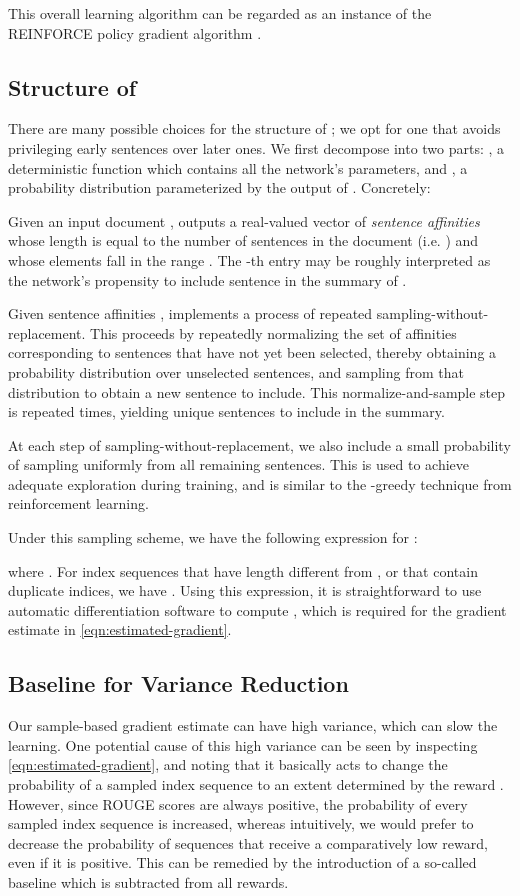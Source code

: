 \documentclass[11pt,a4paper]{article}
\begin{document}
This overall learning algorithm can be regarded as an instance of the REINFORCE policy gradient algorithm \citep{williams1992simple}.

\subsection{Structure of }
There are many possible choices for the structure of ; we opt for one that avoids privileging early sentences over later ones. We first decompose  into two parts: , a deterministic function which contains all the network's parameters, and , a probability distribution parameterized by the output of . Concretely:

Given an input document ,  outputs a real-valued vector of \textit{sentence affinities} whose length is equal to the number of sentences in the document (i.e. ) and whose elements fall in the range . The -th entry  may be roughly interpreted as the network's propensity to include sentence  in the summary of .

Given sentence affinities ,  implements a process of repeated sampling-without-replacement. This proceeds by repeatedly normalizing the set of affinities corresponding to sentences that have not yet been selected, thereby obtaining a probability distribution over unselected sentences, and sampling from that distribution to obtain a new sentence to include. This normalize-and-sample step is repeated  times, yielding  unique sentences to include in the summary.

At each step of sampling-without-replacement, we also include a small probability  of sampling uniformly from all remaining sentences. This is used to achieve adequate exploration during training, and is similar to the -greedy technique from reinforcement learning.

Under this sampling scheme, we have the following expression for :

where . For index sequences that have length different from , or that contain duplicate indices, we have . Using this expression, it is straightforward to use automatic differentiation software to compute , which is required for the gradient estimate in \eqref{eqn:estimated-gradient}.

\subsection{Baseline for Variance Reduction} \label{subsec:baseline}
Our sample-based gradient estimate can have high variance, which can slow the learning. One potential cause of this high variance can be seen by inspecting \eqref{eqn:estimated-gradient}, and noting that it basically acts to change the probability of a sampled index sequence to an extent determined by the reward . However, since ROUGE scores are always positive, the probability of every sampled index sequence is increased, whereas intuitively, we would prefer to decrease the probability of sequences that receive a comparatively low reward, even if it is positive. This can be remedied by the introduction of a so-called baseline which is subtracted from all rewards.
\end{document}
